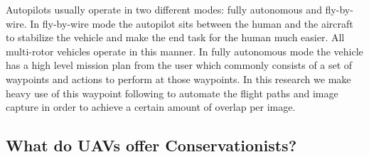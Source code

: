 Autopilots usually operate in two different modes: fully autonomous and fly-by-wire. In fly-by-wire mode the autopilot sits between the human and the aircraft to stabilize the vehicle and make the end task for the human much easier. All multi-rotor vehicles operate in this manner. In fully autonomous mode the vehicle has a high level mission plan from the user which commonly consists of a set of waypoints and actions to perform at those waypoints. In this research we make heavy use of this waypoint following to automate the flight paths and image capture in order to achieve a certain amount of overlap per image.

\subsection{What do UAVs offer Conservationists?}
